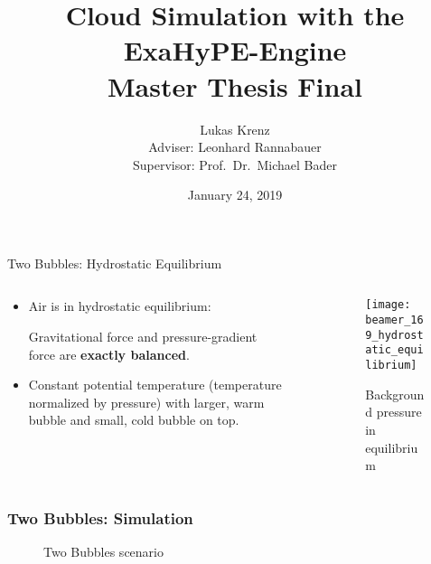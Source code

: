 \documentclass[aspectratio=169]{beamer}
\title{Cloud Simulation with the ExaHyPE-Engine\\Master Thesis Final}
\author{Lukas Krenz\\Adviser: Leonhard Rannabauer\\Supervisor: Prof.\ Dr.\ Michael Bader}
\date{January 24, 2019}
\institute{\textsc{tum}, Chair for Scientific Computing}
\begin{document}
\maketitle
\begin{frame}{Two Bubbles: Hydrostatic Equilibrium}
  \begin{columns}
    \begin{column}[t]{0.5\textwidth}
      \begin{itemize}
      \item 
  Air is in hydrostatic equilibrium:

  Gravitational force and pressure-gradient force are \textbf{exactly balanced}.

  \item Constant potential temperature (temperature normalized by pressure) with larger, warm bubble and small, cold bubble on top.
      
  \end{itemize}
    \end{column}~%
    \begin{column}[t]{0.5\textwidth}
      \begin{figure}[h]
         {
          \texttt{[image: beamer\_169\_hydrostatic\_equilibrium]}
        }
\caption{Background pressure in equilibrium}
\end{figure}
    \end{column}
  \end{columns}
\end{frame}

\begin{frame}
  \frametitle{Two Bubbles: Simulation}
   \begin{figure}[h]
    \centering
     {
  }
    \caption{Two Bubbles scenario}
  \end{figure}
\end{frame}
\end{document}
